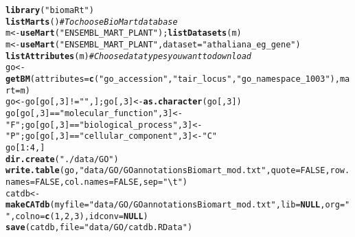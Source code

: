 \documentclass{article}\usepackage[]{graphicx}\usepackage[]{color}
\makeatletter
\newcommand{\hlnum}[1]{\textcolor[rgb]{0.686,0.059,0.569}{#1}}%
\newcommand{\hlstr}[1]{\textcolor[rgb]{0.192,0.494,0.8}{#1}}%
\newcommand{\hlcom}[1]{\textcolor[rgb]{0.678,0.584,0.686}{\textit{#1}}}%
\newcommand{\hlopt}[1]{\textcolor[rgb]{0,0,0}{#1}}%
\newcommand{\hlstd}[1]{\textcolor[rgb]{0.345,0.345,0.345}{#1}}%
\newcommand{\hlkwa}[1]{\textcolor[rgb]{0.161,0.373,0.58}{\textbf{#1}}}%
\newcommand{\hlkwb}[1]{\textcolor[rgb]{0.69,0.353,0.396}{#1}}%
\newcommand{\hlkwc}[1]{\textcolor[rgb]{0.333,0.667,0.333}{#1}}%
\newcommand{\hlkwd}[1]{\textcolor[rgb]{0.737,0.353,0.396}{\textbf{#1}}}%
\newenvironment{kframe}{%
 \def\at@end@of@kframe{}%
 \ifinner\ifhmode%
  \def\at@end@of@kframe{\end{minipage}}%
  \begin{minipage}{\columnwidth}%
 \fi\fi%
 \def\FrameCommand##1{\hskip\@totalleftmargin \hskip-\fboxsep
 \colorbox{shadecolor}{##1}\hskip-\fboxsep
     \hskip-\linewidth \hskip-\@totalleftmargin \hskip\columnwidth}%
 \MakeFramed {\advance\hsize-\width
   \@totalleftmargin\z@ \linewidth\hsize
   \@setminipage}}%
 {\par\unskip\endMakeFramed%
 \at@end@of@kframe}
\newenvironment{knitrout}{}{} %
\makeatother
\begin{document}
\begin{knitrout}
\color{fgcolor}\begin{kframe}
\begin{alltt}
\hlkwd{library}\hlstd{(}\hlstr{"biomaRt"}\hlstd{)}
\hlkwd{listMarts}\hlstd{()} \hlcom{# To choose BioMart database}
\hlstd{m} \hlkwb{<-} \hlkwd{useMart}\hlstd{(}\hlstr{"ENSEMBL_MART_PLANT"}\hlstd{);} \hlkwd{listDatasets}\hlstd{(m)}
\hlstd{m} \hlkwb{<-} \hlkwd{useMart}\hlstd{(}\hlstr{"ENSEMBL_MART_PLANT"}\hlstd{,} \hlkwc{dataset}\hlstd{=}\hlstr{"athaliana_eg_gene"}\hlstd{)}
\hlkwd{listAttributes}\hlstd{(m)} \hlcom{# Choose data types you want to download}
\hlstd{go} \hlkwb{<-} \hlkwd{getBM}\hlstd{(}\hlkwc{attributes}\hlstd{=}\hlkwd{c}\hlstd{(}\hlstr{"go_accession"}\hlstd{,} \hlstr{"tair_locus"}\hlstd{,} \hlstr{"go_namespace_1003"}\hlstd{),} \hlkwc{mart}\hlstd{=m)}
\hlstd{go} \hlkwb{<-} \hlstd{go[go[,}\hlnum{3}\hlstd{]}\hlopt{!=}\hlstr{""}\hlstd{,]; go[,}\hlnum{3}\hlstd{]} \hlkwb{<-} \hlkwd{as.character}\hlstd{(go[,}\hlnum{3}\hlstd{])}
\hlstd{go[go[,}\hlnum{3}\hlstd{]}\hlopt{==}\hlstr{"molecular_function"}\hlstd{,} \hlnum{3}\hlstd{]} \hlkwb{<-} \hlstr{"F"}\hlstd{; go[go[,}\hlnum{3}\hlstd{]}\hlopt{==}\hlstr{"biological_process"}\hlstd{,} \hlnum{3}\hlstd{]} \hlkwb{<-} \hlstr{"P"}\hlstd{; go[go[,}\hlnum{3}\hlstd{]}\hlopt{==}\hlstr{"cellular_component"}\hlstd{,} \hlnum{3}\hlstd{]} \hlkwb{<-} \hlstr{"C"}
\hlstd{go[}\hlnum{1}\hlopt{:}\hlnum{4}\hlstd{,]}
\hlkwd{dir.create}\hlstd{(}\hlstr{"./data/GO"}\hlstd{)}
\hlkwd{write.table}\hlstd{(go,} \hlstr{"data/GO/GOannotationsBiomart_mod.txt"}\hlstd{,} \hlkwc{quote}\hlstd{=}\hlnum{FALSE}\hlstd{,} \hlkwc{row.names}\hlstd{=}\hlnum{FALSE}\hlstd{,} \hlkwc{col.names}\hlstd{=}\hlnum{FALSE}\hlstd{,} \hlkwc{sep}\hlstd{=}\hlstr{"\textbackslash{}t"}\hlstd{)}
\hlstd{catdb} \hlkwb{<-} \hlkwd{makeCATdb}\hlstd{(}\hlkwc{myfile}\hlstd{=}\hlstr{"data/GO/GOannotationsBiomart_mod.txt"}\hlstd{,} \hlkwc{lib}\hlstd{=}\hlkwa{NULL}\hlstd{,} \hlkwc{org}\hlstd{=}\hlstr{""}\hlstd{,} \hlkwc{colno}\hlstd{=}\hlkwd{c}\hlstd{(}\hlnum{1}\hlstd{,}\hlnum{2}\hlstd{,}\hlnum{3}\hlstd{),} \hlkwc{idconv}\hlstd{=}\hlkwa{NULL}\hlstd{)}
\hlkwd{save}\hlstd{(catdb,} \hlkwc{file}\hlstd{=}\hlstr{"data/GO/catdb.RData"}\hlstd{)}
\end{alltt}
\end{kframe}
\end{knitrout}
\end{document}
